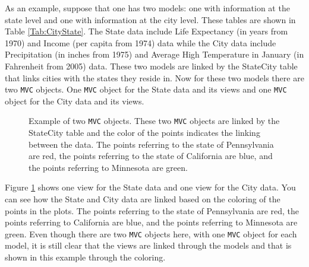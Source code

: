 \documentclass{article}[11pt]
\newcommand{\Robject}[1]{{\texttt{#1}}}
\begin{document}
\normalsize
As an example, suppose that one has two models: one with information at the
state level and one with information at the city level.  These tables are
shown in Table \ref{Tab:CityState}.  The State data include Life Expectancy
(in years from 1970) and Income (per capita from 1974) data
while the City data include Precipitation (in inches from 1975) and Average
High Temperature in January (in Fahrenheit from 2005)
data.  These two models are linked by the StateCity table that links cities
with the states they reside in.  Now for these two models there are
two \Robject{MVC} objects.  One \Robject{MVC} object for the State data and
its views and one \Robject{MVC} object for the City data and its views. 

\begin{figure}[ht]
  \begin{center}
    \caption{ Example of two \Robject{MVC} objects.  These two \Robject{MVC}
      objects are linked by the StateCity table and the color of the points
    indicates the linking between the data.  The points referring to the state
    of Pennsylvania are red, the points referring to the state of California
    are blue, and the points referring to Minnesota are green. }
    \label{Fig:MultMVC}
  \end{center}
\end{figure}

Figure \ref{Fig:MultMVC} shows one view for the State data and one view
for the City data.  You can see how the State and City data are linked based
on the coloring of the points in the plots.  The points referring to the state
of Pennsylvania are red, the points referring to California are blue, and the
points referring to Minnesota are green.  Even though there are two
\Robject{MVC} objects here, with one \Robject{MVC} object for each model,
it is still clear that the views are linked through the models and that is
shown in this example through the coloring.
\end{document}
